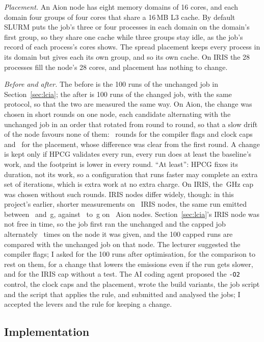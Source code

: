 \documentclass[conference,a4paper]{IEEEtran}
\begin{document}
\emph{Placement.} An Aion node has eight memory domains of 16 cores, and each
domain four groups of four cores that share a 16\,MB L3 cache. By default SLURM
puts the job's three or four processes in each domain on the domain's first
group, so they share one cache while three groups stay idle, as the job's record
of each process's cores shows. The spread placement keeps every process in its
domain but gives each its own group, and so its own cache. On IRIS the 28
processes fill the node's 28 cores, and placement has nothing to change.

\emph{Before and after.} The before is the 100 runs of the unchanged job in
Section~\ref{sec:lcia}; the after is 100 runs of the changed job, with the same
protocol, so that the two are measured the same way. On Aion, the change was
chosen in short rounds on one node, each candidate alternating with the
unchanged job in an order that rotated from round to round, so that a slow drift
of the node favours none of them: \AionOptRounds\ rounds for the compiler flags
and clock caps and \AionPlOptRounds\ for the placement, whose difference was
clear from the first round. A change is kept only if HPCG validates every run,
every run does at least the baseline's work, and the footprint is lower in every
round. ``At least'': HPCG fixes its duration, not its work, so a configuration
that runs faster may complete an extra set of iterations, which is extra work at
no extra charge. On IRIS, the \IrisCapA\,GHz cap was chosen without such rounds.
IRIS nodes differ widely, though: in this project's earlier, shorter
measurements on \IrisNodeCount\ IRIS nodes, the same run emitted between
\IrisNodeGramsMin\ and \IrisNodeGramsMax\,g, against \AionNodeGramsMin\ to
\AionNodeGramsMax\,g on \AionNodeCount\ Aion nodes. Section~\ref{sec:lcia}'s IRIS
node was not free in time, so the
job first ran the unchanged and the capped job alternately \IrisOptRounds\ times
on the node it was given, and the 100 capped runs are compared with the
unchanged job on that node. The lecturer suggested the compiler flags; I asked
for the 100 runs after optimisation, for the comparison to rest on them, for a
change that lowers the emissions even if the run gets slower, and for the IRIS
cap without a test. The AI coding agent proposed the \texttt{-O2} control, the
clock caps and the placement, wrote the build variants, the job script and the
script that applies the rule, and submitted and analysed the jobs; I accepted
the levers and the rule for keeping a change.

\subsection{Implementation}\label{sec:optimpl}
\end{document}
